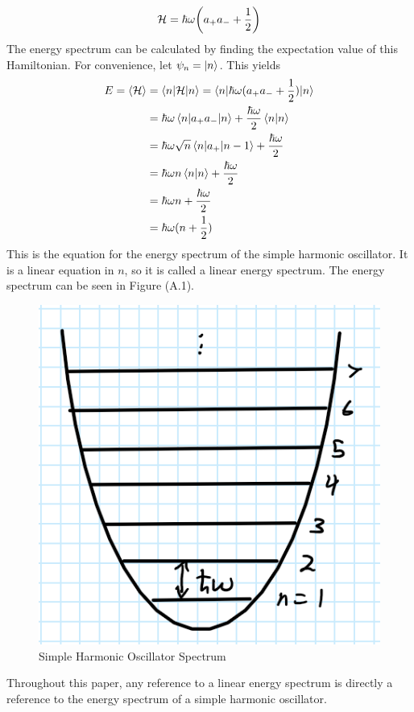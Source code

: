 \begin{equation}
    \mathcal{H}=\hbar\omega\qty(a_+a_-+\frac{1}{2})
\end{equation}
The energy spectrum can be calculated by finding the expectation value of this Hamiltonian. For convenience, let $\psi_n=\ket{n}$. This yields 
\begin{align}
    E=\left<{\mathcal{H}}\right>&=\braket{n|\mathcal{H}|n}=\braket{n|\hbar\omega (a_+a_-+\frac{1}{2})|n}\nonumber\\
    &=\hbar\omega \braket{n|a_+a_-|n}+\frac{\hbar\omega}{2}\braket{n|n}\nonumber\\
    &=\hbar\omega \sqrt{n}\braket{n|a_+|n-1}+\frac{\hbar\omega}{2}\nonumber\\
    &=\hbar\omega n \braket{n|n}+\frac{\hbar\omega}{2}\nonumber\\
    &=\hbar\omega n +\frac{\hbar\omega}{2}\nonumber\\
    &=\hbar\omega(n+\frac{1}{2})
\end{align}
This is the equation for the energy spectrum of the simple harmonic oscillator. It is a linear equation in $n$, so it is called a linear energy spectrum. The energy spectrum can be seen in Figure (A.1).
\begin{figure}
    \centering
    \includegraphics[scale=0.5]{figures/pdf/SHMspectrum.PNG}
    \caption{Simple Harmonic Oscillator Spectrum}
    \label{fig:Simple Harmonic Oscillator Spectrum}
\end{figure}Throughout this paper, any reference to a linear energy spectrum is directly a reference to the energy spectrum of a simple harmonic oscillator.

